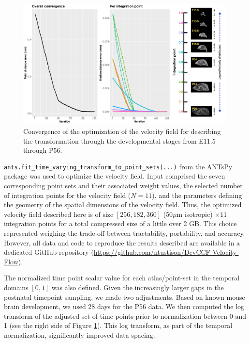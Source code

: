 \documentclass[
  12pt,
]{article}
\begin{document}
\begin{figure}[!htb]
\centering
\includegraphics[width=0.99\textwidth]{Figures/convergence.pdf}
\caption{Convergence of the optimization of the velocity field for describing the 
transformation through the developmental stages from E11.5 through P56.}
\label{fig:convergence}
\end{figure}

\texttt{ants.fit\_time\_varying\_transform\_to\_point\_sets(...)} from
the ANTsPy package was used to optimize the velocity field. Input
comprised the seven corresponding point sets and their associated weight
values, the selected number of integration points for the velocity field
(\(N=11\)), and the parameters defining the geometry of the spatial
dimensions of the velocity field. Thus, the optimized velocity field
described here is of size \([256, 182, 360]\) (\(50 \mu\)m isotropic)
\(\times 11\) integration points for a total compressed size of a little
over 2 GB. This choice represented weighing the trade-off between
tractability, portability, and accuracy. However, all data and code to
reproduce the results described are available in a dedicated GitHub
repository (\url{https://github.com/ntustison/DevCCF-Velocity-Flow}).

The normalized time point scalar value for each atlas/point-set in the
temporal domains \([0, 1]\) was also defined. Given the increasingly
larger gaps in the postnatal timepoint sampling, we made two
adjustments. Based on known mouse brain development, we used 28 days for
the P56 data. We then computed the log transform of the adjusted set of
time points prior to normalization between 0 and 1 (see the right side
of Figure \ref{fig:convergence}). This log transform, as part of the
temporal normalization, significantly improved data spacing.
\end{document}
